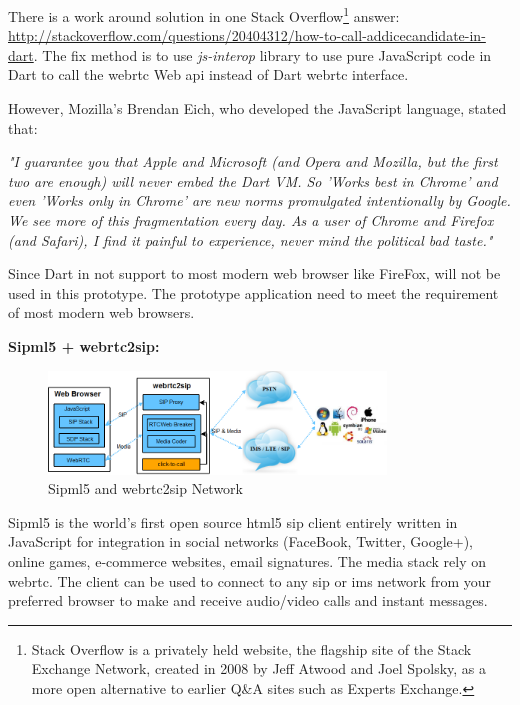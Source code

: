 \par There is a work around solution in one Stack Overflow\footnote{Stack Overflow is a privately held website, the flagship site of the Stack Exchange Network, created in 2008 by Jeff Atwood and Joel Spolsky, as a more open alternative to earlier Q\&A sites such as Experts Exchange.} answer: \url{http://stackoverflow.com/questions/20404312/how-to-call-addicecandidate-in-dart}. The fix method is to use \textit{js-interop} library to use pure JavaScript code in Dart to call the \gls{webrtc} Web \gls{api} instead of Dart \gls{webrtc} interface.
\par However, Mozilla's Brendan Eich, who developed the JavaScript language, stated that:

\textit{"I guarantee you that Apple and Microsoft (and Opera and Mozilla, but the first two are enough) will never embed the Dart VM. So 'Works best in Chrome' and even 'Works only in Chrome' are new norms promulgated intentionally by Google. We see more of this fragmentation every day. As a user of Chrome and Firefox (and Safari), I find it painful to experience, never mind the political bad taste."}\cite{wiki:dart}

\par Since Dart in not support to most modern web browser like FireFox, will not be used in this prototype. The prototype application need to meet the requirement of most modern web browsers.

\textbf{Sipml5 + webrtc2sip:}

\begin{figure}
	\centering
    	\includegraphics[width=0.80\textwidth,natwidth=610,natheight=642]{figs/sipml5_network.png}
  	\caption{Sipml5 and webrtc2sip Network}
  	\label{fig:sipml5_network}
\end{figure}

\par Sipml5 is the world's first open source \gls{html5} \gls{sip} client entirely written in JavaScript for integration in social networks (FaceBook, Twitter, Google+), online games, e-commerce websites, email signatures. The media stack rely on \gls{webrtc}. The client can be used to connect to any \gls{sip} or \gls{ims} network from your preferred browser to make and receive audio/video calls and instant messages.\cite{website:sipml5}


